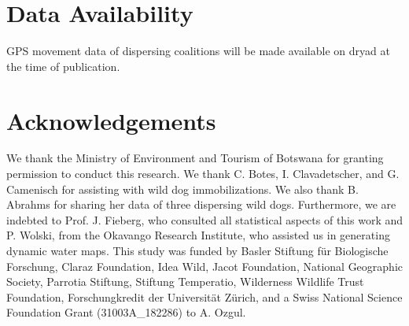 \documentclass[abstract=on,10pt,a4paper,bibliography=totocnumbered]{article}
\begin{document}
\section{Data Availability}
GPS movement data of dispersing coalitions will be made available on dryad at
the time of publication.

\section{Acknowledgements}
We thank the Ministry of Environment and Tourism of Botswana for granting
permission to conduct this research. We thank C. Botes, I. Clavadetscher, and G.
Camenisch for assisting with wild dog immobilizations. We also thank B. Abrahms
for sharing her data of three dispersing wild dogs. Furthermore, we are indebted
to Prof. J. Fieberg, who consulted all statistical aspects of this work and P.
Wolski, from the Okavango Research Institute, who assisted us in generating
dynamic water maps. This study was funded by Basler Stiftung für Biologische
Forschung, Claraz Foundation, Idea Wild, Jacot Foundation, National Geographic
Society, Parrotia Stiftung, Stiftung Temperatio, Wilderness Wildlife Trust
Foundation, Forschungkredit der Universität Zürich, and a Swiss National Science
Foundation Grant (31003A\_182286) to A. Ozgul.

\newpage
\begingroup
\singlespacing

\endgroup
\end{document}

